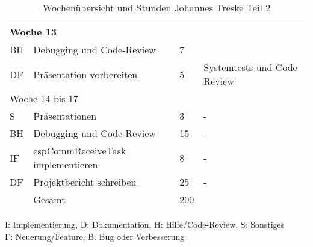 \begin{table}[!hp]
\begin{center}
\begin{tabular}{|p{0.8cm}|p{6cm}|p{0.8cm}|p{8cm}|}
            \multicolumn{4}{|l|}{Woche 13}                                                                                                                  \\ \hline
            BH           & Debugging und Code-Review           & 7             &                                                                            \\
            DF           & Präsentation vorbereiten            & 5             & Systemtests und Code Review                                                \\ \hline
            \multicolumn{4}{|l|}{Woche 14 bis 17}                                                                                                           \\ \hline
            S            & Präsentationen                      & 3             & -                                                                          \\
            BH           & Debugging und Code-Review           & 15            & -                                                                          \\
            IF           & espCommReceiveTask implementieren   & 8             & -                                                                          \\
            DF           & Projektbericht schreiben            & 25            & -                                                                          \\
            \Xhline{3\arrayrulewidth}
                         & Gesamt                              & 200           &                                                                            \\ \hline
        \end{tabular}
    \end{center}
    \label{tab:overviewJohannes2}
    \caption{Wochenübersicht und Stunden Johannes Treske Teil 2}
    I: Implementierung, D: Dokumentation, H: Hilfe/Code-Review, S: Sonstiges\\
    F: Neuerung/Feature, B: Bug oder Verbesserung
\end{table}
\vspace{1em}

\newpage
